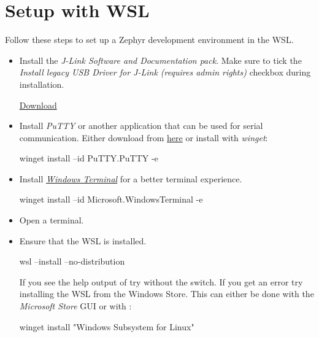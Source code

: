 \section{Setup with WSL}

Follow these steps to set up a Zephyr development environment in the WSL.

\begin{itemize}
  \item Install the \emph{J-Link Software and Documentation pack}.
    Make sure to tick the \emph{Install legacy USB Driver for J-Link (requires admin rights)} checkbox during installation.

    \href{https://www.segger.com/downloads/jlink/JLink_Windows_x86_64.exe}{Download}

  \item Install \emph{PuTTY} or another application that can be used for serial
    communication.
    Either download from \href{https://putty.org/}{here} or install with \emph{winget}:

        \begin{monobox}
winget install --id PuTTY.PuTTY -e
\end{monobox}

  \item Install \href{https://aka.ms/terminal}{\emph{Windows Terminal}} for a better terminal experience.

        \begin{monobox}
winget install --id Microsoft.WindowsTerminal -e
\end{monobox}

  \item Open a terminal.

  \item Ensure that the WSL is installed.
        \begin{monobox}
wsl --install --no-distribution
\end{monobox}

    \begin{infobox}
      If you see the help output of  try without the  switch.
      If you get an error try installing the WSL from the Windows Store.
      This can either be done with the \emph{Microsoft Store} GUI or with :

          \begin{monobox}
winget install "Windows Subsystem for Linux"
\end{monobox}
    \end{infobox}


\end{itemize}
